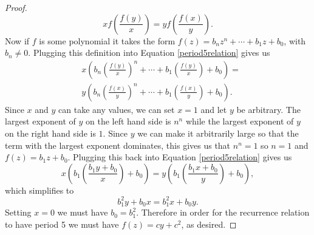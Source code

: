\documentclass[12pt]{article}
\begin{document}
\begin{proof}
\begin{equation}
\label{period5relation}
xf\left(\frac{f(y)}{x}\right) = y f\left(\frac{f(x)}{y}\right).
\end{equation}
Now if $f$ is some polynomial it takes the form $f(z) = b_n z^n + \cdots + b_1 z + b_0$, with $b_n \neq 0$. Plugging this definition into Equation \ref{period5relation} gives us 
\begin{align*}
&x\left( b_n \left( \frac{f(y)}{x}\right)^n + \cdots + b_1 \left( \frac{f(y)}{x}\right) + b_0 \right) = \\
& y\left( b_n \left( \frac{f(x)}{y}\right)^n + \cdots + b_1 \left( \frac{f(x)}{y}\right) + b_0 \right). 
\end{align*}
Since $x$ and $y$ can take any values, we can set $x=1$ and let $y$ be arbitrary. The largest exponent of $y$ on the left hand side is $n^n$ while the largest exponent of $y$ on the right hand side is $1$. Since $y$ we can make it arbitrarily large so that the term with the largest exponent dominates, this gives us that $n^n=1$ so $n=1$ and $f(z) =b_1 z + b_0$. Plugging this back into Equation \ref{period5relation} gives us 
\begin{equation*}
x\left(b_1 \left( \frac{b_1 y + b_0}{x} \right) + b_0 \right) = y\left(b_1 \left( \frac{b_1 x + b_0}{y} \right) + b_0 \right),
\end{equation*}
which simplifies to 
\begin{equation*}
b_1^2 y + b_0 x = b_1^2 x + b_0 y.
\end{equation*}
Setting $x=0$ we must have $b_0=b_1^2$. Therefore in order for the recurrence relation to have period 5 we must have $f(z)=cy+c^2$, as desired. 
\end{proof}
\end{document}

